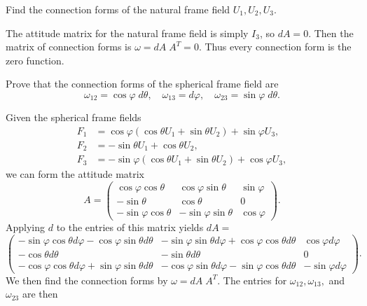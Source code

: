 \documentclass[10pt]{report}
\begin{document}
\begin{exer}[2.7: 2]
	Find the connection forms of the natural frame field $U_1, U_2, U_3$.
\end{exer}
The attitude matrix for the natural frame field is simply $I_3$, so $dA=0$. Then the matrix of connection forms is $\omega=dA\;A^T = 0$. Thus every connection form is the zero function.

\begin{exer}[2.7: 4]
	Prove that the connection forms of the spherical frame field are
	\[
	\omega_{12}=\cos\varphi \;d\theta,\quad \omega_{13}=d\varphi,\quad \omega_{23}=\sin\varphi \;d\theta.
	\] 
\end{exer}
Given the spherical frame fields
\begin{align*}
	F_1&=\cos\varphi(\cos\theta U_1+\sin\theta U_2)+\sin\varphi U_3, \\
	F_2&=-\sin\theta U_1+\cos\theta U_2, \\
	F_3&=-\sin\varphi(\cos\theta U_1+\sin\theta U_2)+\cos\varphi U_3,
\end{align*}
we can form the attitude matrix
\[
A =
\begin{pmatrix}
	\cos\varphi\cos\theta & \cos\varphi\sin\theta & \sin\varphi \\
	-\sin\theta&\cos\theta&0 \\
	-\sin\varphi\cos\theta&-\sin\varphi\sin\theta&\cos\varphi
\end{pmatrix}.
\]
Applying $d$ to the entries of this matrix yields $dA=$
\[
\begin{pmatrix}
	-\sin\varphi\cos\theta d\varphi -\cos\varphi\sin\theta d\theta&-\sin\varphi\sin\theta d\varphi+\cos\varphi\cos\theta d\theta&\cos\varphi d\varphi \\
	-\cos\theta d\theta&-\sin\theta d\theta&0\\
	-\cos\varphi\cos\theta d\varphi+\sin\varphi\sin\theta d\theta&-\cos\varphi\sin\theta d\varphi-\sin\varphi\cos\theta d\theta&-\sin\varphi d\varphi
\end{pmatrix}.
\] 
We then find the connection forms by $\omega=dA\;A^T$. The entries for $\omega_{12},\omega_{13},$ and $\omega_{23}$ are then
\end{document}
